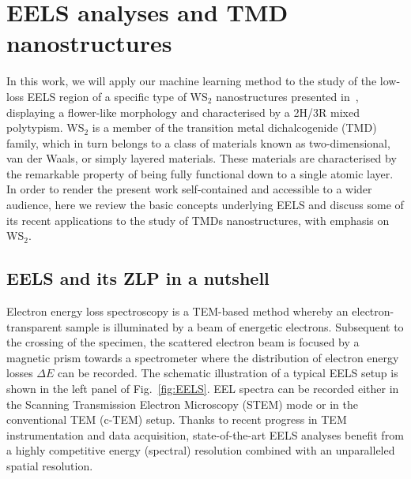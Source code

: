 \section{EELS analyses and TMD nanostructures}
\label{sec:tmdeels}

In this work, we will apply our machine learning method to the study
of the low-loss EELS region of a specific type of WS$_2$ nanostructures presented in~\cite{SabryaWS2},
displaying a flower-like morphology and characterised by  a 2H/3R mixed polytypism.
%
WS$_2$ is a member of the transition metal dichalcogenide (TMD) family, which in turn
belongs to a class of materials known as two-dimensional, van der Waals, or simply layered materials.
%
These materials are
characterised by the remarkable property of being fully functional down to a single atomic layer.
%
In order to render the present work self-contained and accessible to a wider audience,
here we review the basic concepts underlying  EELS
and discuss some of its recent applications to the study of TMDs nanostructures, with emphasis
on WS$_2$.

\subsection{EELS and its ZLP in a nutshell}
\label{sec:tmd}

Electron energy loss spectroscopy is a TEM-based method
whereby an electron-transparent sample is illuminated by a 
beam of energetic electrons.
%
Subsequent to the crossing of
the specimen, the scattered electron beam is focused by a magnetic prism
towards a spectrometer where the distribution of electron energy losses $\Delta E$ can be recorded.
%
The schematic illustration of a typical EELS setup is shown in the left panel of Fig.~\ref{fig:EELS}.
%
EEL spectra can be recorded either in the Scanning Transmission Electron Microscopy (STEM) mode
or in the conventional TEM (c-TEM) setup.
%
Thanks to recent progress in TEM instrumentation and data acquisition, state-of-the-art EELS analyses benefit from
a highly competitive energy (spectral) resolution combined with an unparalleled spatial resolution.

